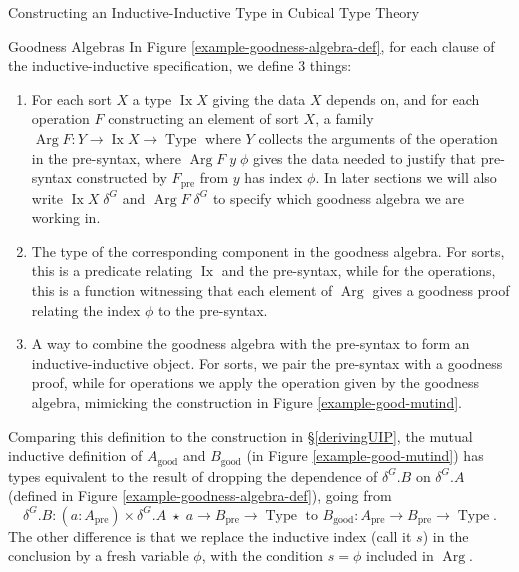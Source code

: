 \documentclass[runningheads]{llncs}
\newcommand{\erase}[1]{{}}
\DeclareMathOperator{\USet}{Type}
\DeclareMathOperator{\Arg}{Arg}
\DeclareMathOperator{\Ix}{Ix}
\newcommand{\pre}[1]{{#1}_\text{pre}}
\newcommand{\good}[1]{{#1}_\text{good}}
\begin{document}
\begin{section}{Constructing an Inductive-Inductive Type in Cubical Type Theory}
\begin{subsection}{Goodness Algebras}
In Figure \ref{example-goodness-algebra-def}, for each clause of the inductive-inductive specification, we define 3 things:
\begin{enumerate}
    \item For each sort $X$ a type $\Ix X$ giving the data $X$ depends on, and for each operation $F$ constructing an element of sort $X$, a family $\Arg F : Y \to \Ix X \to \USet$ where $Y$ collects the arguments of the operation in the pre-syntax, where $\Arg F\;y\;\phi$ gives the data needed to justify that pre-syntax constructed by $\pre{F}$ from $y$ has index $\phi$. In later sections we will also write $\Ix X\;\delta^G$ and $\Arg F\;\delta^G$ to specify which goodness algebra we are working in.
    \item The type of the corresponding component in the goodness algebra. For sorts, this is a predicate relating $\Ix$ and the pre-syntax, while for the operations, this is a function witnessing that each element of $\Arg$ gives a goodness proof relating the index $\phi$ to the pre-syntax.
    \item A way to combine the goodness algebra with the pre-syntax to form an inductive-inductive object. For sorts, we pair the pre-syntax with a goodness proof, while for operations we apply the operation given by the goodness algebra, mimicking the construction in Figure \ref{example-good-mutind}.
\end{enumerate}

Comparing this definition to the construction in \S\ref{derivingUIP}, the mutual inductive definition of $\good{A}$ and $\good{B}$ (in Figure \ref{example-good-mutind}) has types equivalent to the result of dropping the dependence of $\delta^G.B$ on $\delta^G.A$ (defined in Figure \ref{example-goodness-algebra-def}), going from \[\delta^G.B : (a : \pre{A}) \times \delta^G.A\;\star\;a \to \pre{B} \to \USet \text{ to } \good{B} : \pre{A} \to \pre{B} \to \USet.\] The other difference is that we replace the inductive index (call it $s$) in the conclusion by a fresh variable $\phi$, with the condition $s = \phi$ included in $\Arg$.

\erase{
Consider the sort $B$. The inductive index of $B$ is $a : A$, so we set $\Ix B = A$. Our goodness algebra has a predicate $\delta^G.B : \Ix B \to \pre{B} \to \USet$, which defines a relation between the inductive index and the pre-syntax. And we define an elements of $B\;\phi$ to be pairs of pre-syntax with a proof that it is related to $\phi$ by the goodness algebra. The definition of the sort $A$ follows the same pattern, but there $A$ has no inductive index, or rather has $\top$ as the inductive index, so we set $\Ix A = \top$.

}
\end{subsection}
\end{section}
\end{document}
